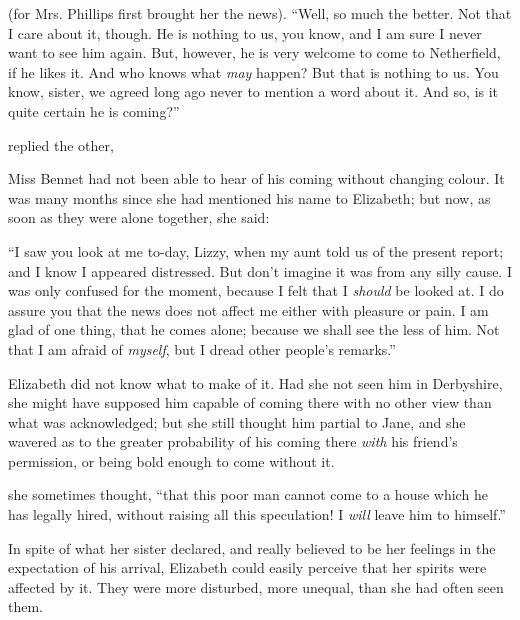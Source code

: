 (for Mrs. Phillips first brought her the news). “Well, so much the better. Not that I care about it, though. He is nothing to us, you know, and I am sure I never want to see him again. But, however, he is very welcome to come to Netherfield, if he likes it. And who knows what {\em may} happen? But that is nothing to us. You know, sister, we agreed long ago never to mention a word about it. And so, is it quite certain he is coming?”

 replied the other, 

Miss Bennet had not been able to hear of his coming without changing colour. It was many months since she had mentioned his name to Elizabeth; but now, as soon as they were alone together, she said:

“I saw you look at me to-day, Lizzy, when my aunt told us of the present report; and I know I appeared distressed. But don't imagine it was from any silly cause. I was only confused for the moment, because I felt that I {\em should} be looked at. I do assure you that the news does not affect me either with pleasure or pain. I am glad of one thing, that he comes alone; because we shall see the less of him. Not that I am afraid of {\em myself}, but I dread other people's remarks.”

Elizabeth did not know what to make of it. Had she not seen him in Derbyshire, she might have supposed him capable of coming there with no other view than what was acknowledged; but she still thought him partial to Jane, and she wavered as to the greater probability of his coming there {\em with} his friend's permission, or being bold enough to come without it.

 she sometimes thought, “that this poor man cannot come to a house which he has legally hired, without raising all this speculation! I {\em will} leave him to himself.”

In spite of what her sister declared, and really believed to be her feelings in the expectation of his arrival, Elizabeth could easily perceive that her spirits were affected by it. They were more disturbed, more unequal, than she had often seen them.

